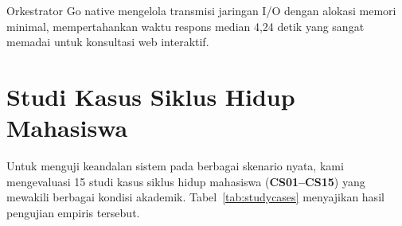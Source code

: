 \documentclass[conference]{IEEEtran}
\begin{document}
\begin{table}[htbp]
\caption{Rincian Latensi Komputasi Pipeline Two-Stage AURA Core}
\label{tab:latency}
\centering
{}
\end{table}

Orkestrator Go native mengelola transmisi jaringan I/O dengan alokasi memori minimal, mempertahankan waktu respons median 4,24 detik yang sangat memadai untuk konsultasi web interaktif.

\section{Studi Kasus Siklus Hidup Mahasiswa}
Untuk menguji keandalan sistem pada berbagai skenario nyata, kami mengevaluasi 15 studi kasus siklus hidup mahasiswa (\textbf{CS01--CS15}) yang mewakili berbagai kondisi akademik. Tabel~\ref{tab:studycases} menyajikan hasil pengujian empiris tersebut.
\end{document}
